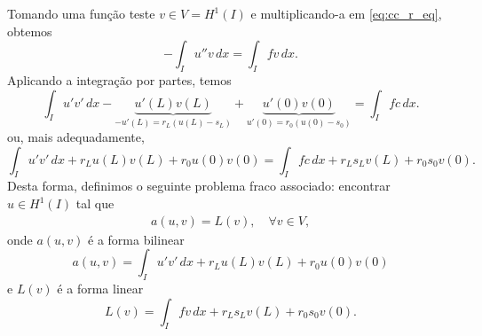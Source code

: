 Tomando uma função teste $v\in V= H^1(I)$ e multiplicando-a em \eqref{eq:cc_r_eq}, obtemos
\begin{equation}
  - \int_I u''v\,dx = \int_I fv\,dx.
\end{equation}
Aplicando a integração por partes, temos
\begin{equation}
  \int_I u'v'\,dx - \underbrace{u'(L)v(L)}_{-u'(L)=r_L(u(L)-s_L)} + \underbrace{u'(0)v(0)}_{u'(0)=r_0(u(0)-s_0)} = \int_I fc\,dx.
\end{equation}
ou, mais adequadamente,
\begin{equation}
  \int_I u'v'\,dx + r_Lu(L)v(L) +r_0u(0)v(0) = \int_I fc\,dx + r_Ls_Lv(L) + r_0s_0v(0).
\end{equation}
Desta forma, definimos o seguinte problema fraco associado: encontrar $u\in H^1(I)$ tal que
\begin{align}
  a(u,v) = L(v),\quad\forall v\in V,
\end{align}
onde $a(u,v)$ é a forma bilinear
\begin{equation}
  a(u,v) = \int_I u'v'\,dx + r_Lu(L)v(L) + r_0u(0)v(0)
\end{equation}
e $L(v)$ é a forma linear
\begin{equation}
  L(v) = \int_I fv\,dx + r_Ls_Lv(L) + r_0s_0v(0).
\end{equation}

